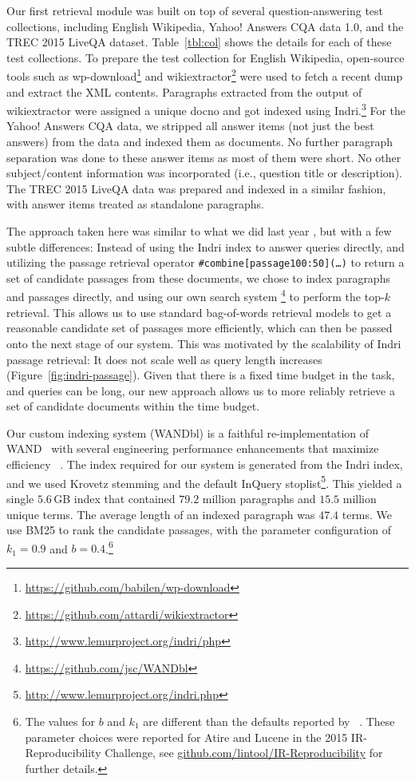 \documentclass[a4paper,10pt,conference,compsocconf,final]{IEEEtran}
\newcommand\method[1]{{\sf\small{#1}}}
\newcommand\gb[1]{$#1$\,GB}
\begin{document}
Our first retrieval module was built on top of several
question-answering test collections, including English Wikipedia,
Yahoo!  Answers CQA data 1.0, and the TREC 2015 LiveQA dataset.
Table~{\ref{tbl:col}} shows the details for each of these test collections.
To prepare the test collection for English Wikipedia, open-source
tools such as
{\method{wp-download}}\footnote{\url{https://github.com/babilen/wp-download}}
and
{\method{wikiextractor}}\footnote{\url{https://github.com/attardi/wikiextractor}}
were used to fetch a recent dump and extract the XML contents.
Paragraphs extracted from the output of {\method{wikiextractor}} were
assigned a unique docno and got indexed using
Indri.\footnote{\url{http://www.lemurproject.org/indri/php}} For the
Yahoo!  Answers CQA data, we stripped all answer items (not just the best
answers) from the data and indexed them as documents.
No further paragraph separation was done to these answer items as
most of them were short.
No other subject/content information was incorporated (i.e.,
question title or description).
The TREC 2015 LiveQA data was prepared and indexed in a similar
fashion, with answer items treated as standalone paragraphs.

The approach taken here was similar to what we did last year
{\cite{rmit_liveqa_2015}}, but with a few subtle differences: 
Instead of using the Indri index to answer queries directly, and
utilizing the passage retrieval operator
{\texttt{\#combine[passage100:50](\ldots)}} to return a set of
candidate passages from these documents, we chose to index paragraphs
and passages directly, and using our own search system 
{\footnote{\url{https://github.com/jsc/WANDbl}}} to perform the
top-$k$ retrieval.
This allows us to use standard bag-of-words retrieval models to get a
reasonable candidate set of passages more efficiently, which can then
be passed onto the next stage of our system.
This was motivated by the scalability of Indri passage retrieval: It
does not scale well as query length increases
(Figure~\ref{fig:indri-passage}).
Given that there is a fixed time budget in the task, and queries can
be long, our new approach allows us to more reliably retrieve a set
of candidate documents within the time budget.

Our custom indexing system ({\footnotesize{\sf WANDbl}}) is a faithful
re-implementation of WAND~\citep{wand} with several engineering
performance enhancements that maximize efficiency
~{\citep{pcm13-adcs,pmc14-sigir,mcc15-adcs}}.
The index required for our system is generated from the Indri index,
and we used Krovetz stemming and the default InQuery
stoplist\footnote{\url{http://www.lemurproject.org/indri.php}}.
This yielded a single \gb{5.6} index that contained $79.2$ million
paragraphs and $15.5$ million unique terms.
The average length of an indexed paragraph was $47.4$ terms.
We use BM25 to rank the candidate passages, with the parameter
configuration of $k_1=0.9$ and $b=0.4$.\footnote{The values for $b$
and $k_1$ are different than the defaults reported by
~{\citet{rwj+94-trec}}.
These parameter choices were reported for Atire and Lucene in the
2015 IR-Reproducibility Challenge, see
{\url{github.com/lintool/IR-Reproducibility}} for further details.}
\end{document}
